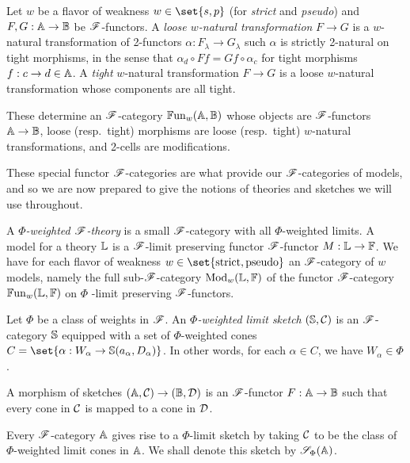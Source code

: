 \documentclass[../thesis.tex]{subfiles}
\begin{document}
\begin{definition}
  Let $w$ be a flavor of weakness $w \in \set{s,p}$ (for \emph{strict} and \emph{pseudo}) and $F, G : {\mathbb{A}} \to {\mathbb{B}}$
  be ${\mathscr{F}}$-functors. A \emph{loose $w$-natural transformation} $F \to G$ is a $w$-natural transformation
  of 2-functors $\alpha : F_\lambda \to G_\lambda$ such $\alpha$ is strictly 2-natural on tight morphisms,
  in the sense that $\alpha_d \circ F f = G f \circ \alpha_c$ for tight morphisms $f : c \to d \in {\mathbb{A}}$. 
  A \emph{tight} $w$-natural transformation $F \to G$ is a loose $w$-natural transformation whose components
  are all tight.

  These determine an ${\mathscr{F}}$-category ${\mathbb{F}\mathrm{un}}_w({\mathbb{A}},{\mathbb{B}})$ whose objects are ${\mathscr{F}}$-functors ${\mathbb{A}} \to
  {\mathbb{B}}$, loose (resp.\ tight) morphisms are loose (resp.\ tight) $w$-natural transformations,
  and 2-cells are modifications. 
\end{definition}

These special functor ${\mathscr{F}}$-categories are what provide our ${\mathscr{F}}$-categories of models, and so we are
now prepared to give the notions of theories and sketches we will use throughout.

\begin{definition}
  A \emph{$\Phi$-weighted ${\mathscr{F}}$-theory} is a small ${\mathscr{F}}$-category with all $\Phi$-weighted limits. A model
  for a theory ${\mathbb{L}}$ is a ${\mathscr{F}}$-limit preserving functor ${\mathscr{F}}$-functor $M : {\mathbb{L}} \to {\mathbb{F}}$. We have for each
  flavor  of weakness $w \in \set{\text{strict}, \text{pseudo}}$ an ${\mathscr{F}}$-category of $w$ models, namely
  the full sub-${\mathscr{F}}$-category ${\mathrm{Mod}}_w({\mathbb{L}}, {\mathbb{F}})$ of the functor ${\mathscr{F}}$-category ${\mathbb{F}\mathrm{un}}_w({\mathbb{L}},{\mathbb{F}})$ on $\Phi$%
  -limit preserving ${\mathscr{F}}$-functors.
\end{definition}

\begin{definition}
  Let $\Phi$ be a class of weights in ${\mathscr{F}}$. An \emph{$\Phi$-weighted limit sketch} $({\mathbb{S}},{\mathcal{C}})$ is an
  ${\mathscr{F}}$-category ${\mathbb{S}}$ equipped with a set of $\Phi$-weighted cones $C = \set{\alpha : W_\alpha \to \bS(
  a_\alpha,D_\alpha)}$. In other words, for each $\alpha \in C$, we have $W_\alpha \in \Phi$.

  A morphism of sketches $({\mathbb{A}},{\mathcal{C}}) \to ({\mathbb{B}}, {\mathcal{D}})$ is an ${\mathscr{F}}$-functor $F : {\mathbb{A}} \to {\mathbb{B}}$ such that every
  cone in ${\mathcal{C}}$ is mapped to a cone in ${\mathcal{D}}$.
\end{definition}

Every ${\mathscr{F}}$-category ${\mathbb{A}}$ gives rise to a $\Phi$-limit sketch by taking ${\mathcal{C}}$ to be the class of
$\Phi$-weighted limit cones in ${\mathbb{A}}$. We shall denote this sketch by ${\mathscr{S}}_\Phi({\mathbb{A}})$.
\end{document}

